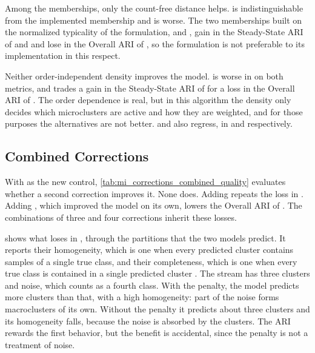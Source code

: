 Among the memberships, only the count-free distance helps.  is indistinguishable from the implemented membership and  is worse. The two memberships built on the normalized typicality of the formulation,  and , gain in the Steady-State ARI of \ChameleonDSFour and  and lose in the Overall ARI of \ChameleonDSThree, so the formulation is not preferable to its implementation in this respect.

Neither order-independent density improves the model.  is worse in \ChameleonDSThree on both metrics, and  trades a gain in the Steady-State ARI of \RandomRBFGeneratorEvents for a loss in the Overall ARI of \Cassini. The order dependence is real, but in this algorithm the density only decides which microclusters are active and how they are weighted, and for those purposes the alternatives are not better.  and  also regress, in \ChameleonDSThree and \ChameleonDSFour respectively.

\subsection{Combined Corrections}



With  as the new control, \cref{tab:mi_corrections_combined_quality} evaluates whether a second correction improves it. None does. Adding  repeats the loss in \ChameleonDSThree. Adding , which improved the  model on its own, lowers the Overall ARI of . The combinations of three and four corrections inherit these losses.



 shows what  loses in , through the partitions that the two models predict. It reports their homogeneity, which is one when every predicted cluster contains samples of a single true class, and their completeness, which is one when every true class is contained in a single predicted cluster \cite{rosenberg2007vmeasure}. The stream has three clusters and noise, which counts as a fourth class. With the penalty, the model predicts more clusters than that, with a high homogeneity: part of the noise forms macroclusters of its own. Without the penalty it predicts about three clusters and its homogeneity falls, because the noise is absorbed by the clusters. The ARI rewards the first behavior, but the benefit is accidental, since the penalty is not a treatment of noise.


